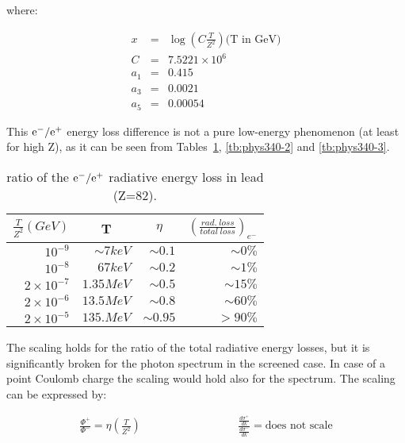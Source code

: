where:

\begin{eqnarray*}
x & = & \log \left ( C \frac{T}{Z^2} \right ) \mbox{(T in GeV)} \\
C & = & 7.5221 \times 10^{6} \\
a_1 & = & 0.415 \\
a_3 & = & 0.0021 \\
a_5 & = & 0.00054
\end{eqnarray*}

This $\mathrm{e}^-/\mathrm{e}^+$ energy loss difference is not a pure low-energy
phenomenon (at least for high Z), as it can be seen from 
Tables~\ref{tb:phys340-1}, \ref{tb:phys340-2} and \ref{tb:phys340-3}.

\begin{table}[hbt]
\begin{centering}
\begin{tabular}{rr|r|r} \hline
\multicolumn{1}{c}{$\frac{T}{Z^2} (GeV)$}
& \multicolumn{1}{c|}{T} 
& \multicolumn{1}{c|}{$\eta$}
& \multicolumn{1}{c}{$\left ( \frac{rad. \ loss}{total \ loss}
\right )_{e^-}$} \\[3mm] \hline
$10^{-9}$ & $\sim 7 keV$ & $\sim 0.1$ & $\sim 0\%$ \\
$10^{-8}$ & $67 keV $ & $\sim 0.2$ & $\sim 1\%$ \\
$2 \times 10^{-7}$ & $1.35 MeV$ & $\sim 0.5$ & $\sim 15\%$ \\
$2 \times 10^{-6}$ & $13.5 MeV$ & $\sim 0.8$ & $\sim 60\%$ \\
$2 \times 10^{-5}$ & $135. MeV$ & $\sim 0.95$ & $> 90\%$ \\ \hline
\end{tabular}
\caption{ratio of the $\mathrm{e}^-/\mathrm{e}^+$ radiative energy loss in lead 
(Z=82).}
\label{tb:phys340-1}
\end{centering}
\end{table}

The scaling holds for the ratio of the total radiative energy
losses, but it is significantly broken for the photon spectrum
in the screened case. 
In case of a point Coulomb charge the
scaling would hold also for the spectrum. 
The scaling can be expressed by:

\begin{eqnarray*}
\frac{\Phi^+}{\Phi^-} = \eta \left ( \frac{T}{Z^2} \right ) 
& \hspace{3cm} &
\frac{\frac{d\sigma^+}{dk}}{\frac{d\sigma^-}{dk}} = 
\mbox{does not scale}
\end{eqnarray*}

